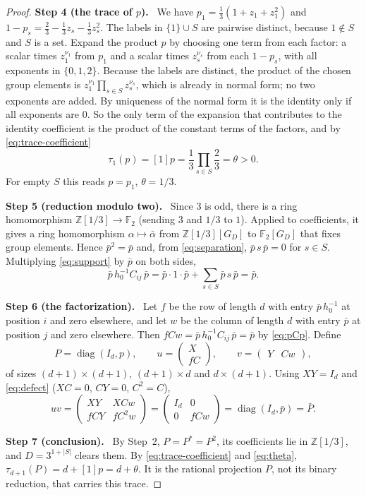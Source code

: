 \documentclass[11pt]{article}
\theoremstyle{remark}
\numberwithin{equation}{section}
\newcommand{\F}{\mathbb F}
\newcommand{\Z}{\mathbb Z}
\newcommand{\diag}{\operatorname{diag}}
\newcommand{\step}[1]{\par\smallskip\noindent\textbf{Step #1.}\ }
\begin{document}
\begin{proof}
\step{4 (the trace of $p$)}
We have $p_1=\frac13(1+z_1+z_1^2)$ and $1-p_s=\frac23-\frac13z_s-\frac13z_s^2$. The labels in $\{1\}\cup S$ are pairwise distinct, because $1\notin S$ and $S$ is a set. Expand the product $p$ by choosing one term from each factor: a scalar times $z_1^{\nu_1}$ from $p_1$ and a scalar times $z_s^{\nu_s}$ from each $1-p_s$, with all exponents in $\{0,1,2\}$. Because the labels are distinct, the product of the chosen group elements is $z_1^{\nu_1}\prod_{s\in S}z_s^{\nu_s}$, which is already in normal form; no two exponents are added. By uniqueness of the normal form it is the identity only if all exponents are $0$. So the only term of the expansion that contributes to the identity coefficient is the product of the constant terms of the factors, and by \eqref{eq:trace-coefficient}
\begin{equation}\label{eq:theta}
 \tau_1(p)=[1]p=\frac13\prod_{s\in S}\frac23=\theta>0.
\end{equation}
For empty $S$ this reads $p=p_1$, $\theta=1/3$.

\step{5 (reduction modulo two)}
Since $3$ is odd, there is a ring homomorphism $\Z[1/3]\to\F_2$ (sending $3$ and $1/3$ to $1$). Applied to coefficients, it gives a ring homomorphism $\alpha\mapsto\bar\alpha$ from $\Z[1/3][G_D]$ to $\F_2[G_D]$ that fixes group elements. Hence $\bar p^2=\bar p$ and, from \eqref{eq:separation}, $\bar p\,s\,\bar p=0$ for $s\in S$. Multiplying \eqref{eq:support} by $\bar p$ on both sides,
\begin{equation}\label{eq:pCp}
 \bar p\,h_0^{-1}C_{ij}\,\bar p=\bar p\cdot1\cdot\bar p+\sum_{s\in S}\bar p\,s\,\bar p=\bar p.
\end{equation}

\step{6 (the factorization)}
Let $f$ be the row of length $d$ with entry $\bar p\,h_0^{-1}$ at position $i$ and zero elsewhere, and let $w$ be the column of length $d$ with entry $\bar p$ at position $j$ and zero elsewhere. Then $fCw=\bar p\,h_0^{-1}C_{ij}\,\bar p=\bar p$ by \eqref{eq:pCp}. Define
\[
 P=\diag(I_d,p),\qquad
 u=\begin{pmatrix}X\\fC\end{pmatrix},\qquad
 v=\begin{pmatrix}Y&Cw\end{pmatrix},
\]
of sizes $(d+1)\times(d+1)$, $(d+1)\times d$ and $d\times(d+1)$. Using $XY=I_d$ and \eqref{eq:defect} ($XC=0$, $CY=0$, $C^2=C$),
\[
 uv=\begin{pmatrix}XY&XCw\\fCY&fC^2w\end{pmatrix}
   =\begin{pmatrix}I_d&0\\0&fCw\end{pmatrix}
   =\diag(I_d,\bar p)=\bar P.
\]

\step{7 (conclusion)}
By Step~2, $P=P^*=P^2$, its coefficients lie in $\Z[1/3]$, and $D=3^{1+|S|}$ clears them. By \eqref{eq:trace-coefficient} and \eqref{eq:theta}, $\tau_{d+1}(P)=d+[1]p=d+\theta$. It is the rational projection $P$, not its binary reduction, that carries this trace.
\end{proof}
\end{document}
